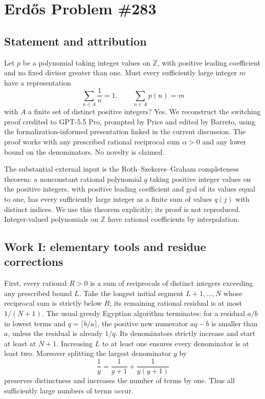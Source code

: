 \section{Erd\H{o}s Problem \#283}
\subsection{Statement and attribution}
Let $p$ be a polynomial taking integer values on $\mathbb Z$, with positive leading coefficient and no fixed divisor greater than one. Must every sufficiently large integer $m$ have a representation
\[
 \sum_{n\in A}\frac1n=1,\qquad \sum_{n\in A}p(n)=m
\]
with $A$ a finite set of distinct positive integers? Yes. We reconstruct the switching proof credited to GPT-5.5 Pro, prompted by Price and edited by Barreto, using the formalization-informed presentation linked in the current discussion. The proof works with any prescribed rational reciprocal sum $\alpha>0$ and any lower bound on the denominators. No novelty is claimed.

The substantial external input is the Roth--Szekeres--Graham completeness theorem: a nonconstant rational polynomial $q$ taking positive integer values on the positive integers, with positive leading coefficient and gcd of its values equal to one, has every sufficiently large integer as a finite sum of values $q(j)$ with distinct indices. We use this theorem explicitly; its proof is not reproduced. Integer-valued polynomials on $\mathbb Z$ have rational coefficients by interpolation.

\subsection{Work I: elementary tools and residue corrections}
First, every rational $R>0$ is a sum of reciprocals of distinct integers exceeding any prescribed bound $L$. Take the longest initial segment $L+1,\ldots,N$ whose reciprocal sum is strictly below $R$; its remaining rational residual is at most $1/(N+1)$. The usual greedy Egyptian algorithm terminates: for a residual $a/b$ in lowest terms and $q=\lceil b/a\rceil$, the positive new numerator $aq-b$ is smaller than $a$, unless the residual is already $1/q$. Its denominators strictly increase and start at least at $N+1$. Increasing $L$ to at least one ensures every denominator is at least two.
Moreover splitting the largest denominator $y$ by
\[
 \frac1y=\frac1{y+1}+\frac1{y(y+1)}
 \tag{1}
\]
preserves distinctness and increases the number of terms by one. Thus all sufficiently large numbers of terms occur.

